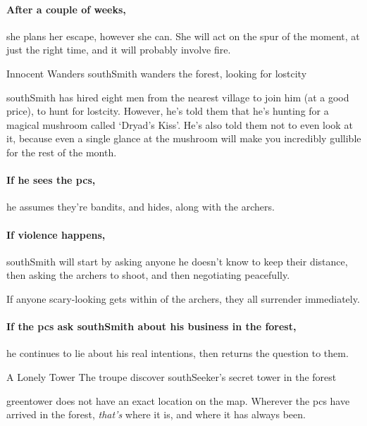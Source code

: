 \paragraph{After a couple of weeks,}
she plans her escape, however she can.
She will act on the spur of the moment, at just the right time, and it will probably involve fire.

{Innocent Wanders}%
{\Gls{southSmith} wanders the forest, looking for \gls{lostcity}}%

\Gls{southSmith} has hired eight men from the nearest \gls{village} to join him (at a good price), to hunt for \gls{lostcity}.
However, he's told them that he's hunting for a magical mushroom called `Dryad's Kiss'.%
He's also told them not to even look at it, because even a single glance at the mushroom will make you incredibly gullible for the rest of the month.

\southSmith

\paragraph{If he sees the \glspl{pc},}
he assumes they're bandits, and hides, along with the archers.


\paragraph{If violence happens,}
\gls{southSmith} will start by asking anyone he doesn't know to keep their distance, then asking the archers to shoot, and then negotiating peacefully.

If anyone scary-looking gets within  of the archers, they all surrender immediately.

\paragraph{If the \glspl{pc} ask \gls{southSmith} about his business in the forest,}
he continues to lie about his real intentions, then returns the question to them.

{A Lonely Tower}%
{The troupe discover \gls{southSeeker}'s secret tower in the forest}%


\Gls{greentower} does not have an exact location on the map.
Wherever the \glspl{pc} have arrived in the forest, \textit{that's} where it is, and where it has always been.

